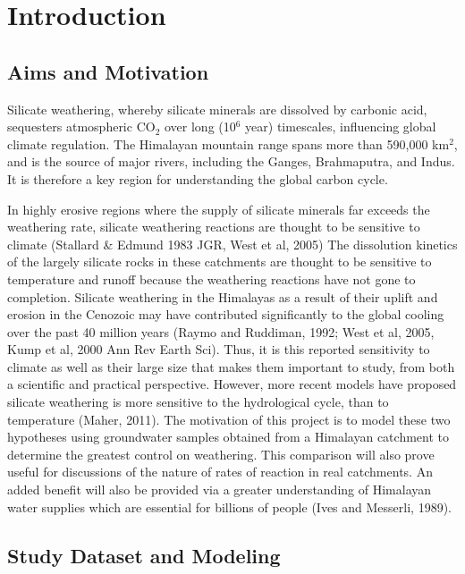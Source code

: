 
\section{Introduction}

\subsection{Aims and Motivation}

Silicate weathering, whereby silicate minerals are dissolved by carbonic acid, 
sequesters atmospheric CO$_2$ over long (10$^6$ year) timescales, influencing global climate regulation. The Himalayan mountain range spans more than 590,000 km$^2$, and is the source of major rivers, including the Ganges, Brahmaputra, and Indus. It is therefore a key region for understanding the global carbon cycle.

\bsk

In highly erosive regions where the supply of silicate minerals far exceeds the weathering rate, silicate weathering reactions are thought to be sensitive to climate (Stallard \& Edmund 1983 JGR, West et al, 2005) The dissolution kinetics of the largely silicate rocks in these catchments are thought to be sensitive to temperature and runoff because the weathering reactions have not gone to completion. Silicate weathering in the Himalayas as a result of their uplift and erosion in the Cenozoic may have contributed significantly to the global 
cooling over the past 40 million years (Raymo and Ruddiman, 1992; West et al, 2005, Kump et al, 2000 Ann Rev Earth Sci). Thus, it is this reported sensitivity to climate as well as their large size that makes them important to study, from both a scientific and practical perspective. However, more recent models have proposed silicate weathering is more sensitive to the hydrological cycle, than to temperature (Maher, 2011). The motivation of this project is to model these two hypotheses using groundwater samples obtained from a Himalayan catchment to determine the greatest control on weathering. This comparison will also prove useful for discussions of the nature of rates of reaction in real catchments. An added benefit will also be provided via a greater understanding of Himalayan water supplies which are essential for billions of people (Ives and Messerli, 1989). 


\subsection{Study Dataset and Modeling}

